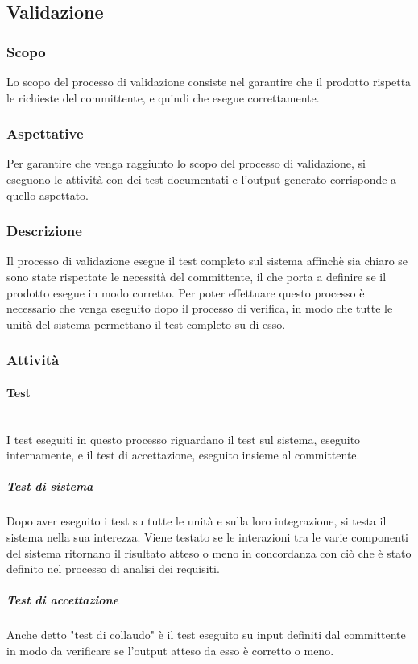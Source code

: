\subsection{Validazione}

	\subsubsection{Scopo}
		Lo scopo del processo di validazione consiste nel garantire che il prodotto rispetta le richieste del committente, e quindi che esegue correttamente.
	\subsubsection{Aspettative}
		Per garantire che venga raggiunto lo scopo del processo di validazione, si eseguono le attività con dei test documentati e l'output generato corrisponde a quello aspettato.
	\subsubsection{Descrizione}
		Il processo di validazione esegue il test completo sul sistema affinchè sia chiaro se sono state rispettate le necessità del committente, il che porta a definire se il prodotto esegue in modo corretto. Per poter effettuare questo processo è necessario che venga eseguito dopo il processo di verifica, in modo che tutte le unità del sistema permettano il test completo su di esso. 
	\subsubsection{Attività}
		\paragraph{Test}\mbox{}\\
			I test eseguiti in questo processo riguardano il test sul sistema, eseguito internamente, e il test di accettazione, eseguito insieme al committente.
			\subparagraph*{Test di sistema}
				Dopo aver eseguito i test su tutte le unità e sulla loro integrazione, si testa il sistema nella sua interezza. Viene testato se le interazioni tra le varie componenti del sistema ritornano il risultato atteso o meno in concordanza con ciò che è stato definito nel processo di analisi dei requisiti.
			\subparagraph*{Test di accettazione}   
				Anche detto "test di collaudo" è il test eseguito su input definiti dal committente in modo da verificare se l'output atteso da esso è corretto o meno.